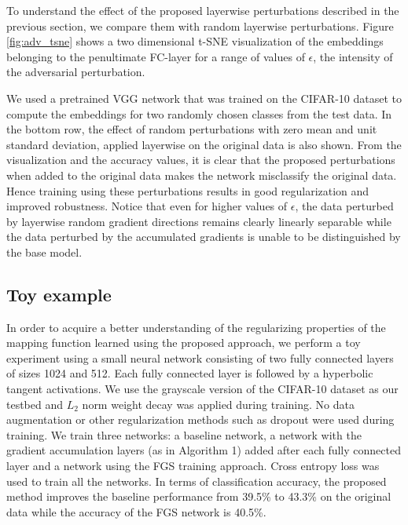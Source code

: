 \documentclass[letterpaper]{article} %
\begin{document}
  
To understand the effect of the proposed layerwise perturbations described in the previous section, we compare them with random layerwise perturbations. Figure \ref{fig:adv_tsne} shows a two dimensional t-SNE \cite{maaten2008visualizing} visualization of the embeddings belonging to the penultimate FC-layer for a range of values of $\epsilon$, the intensity of the adversarial perturbation. 

We used a pretrained VGG network that was trained on the CIFAR-10 dataset to compute the embeddings for two randomly chosen classes from the test data. In the bottom row, the effect of random perturbations with zero mean and unit standard deviation, applied layerwise on the original data is also shown. From the visualization and the accuracy values, it is clear that the proposed perturbations when added to the original data makes the network misclassify the original data. Hence training using these perturbations results in good regularization and improved robustness. Notice that even for higher values of $\epsilon$, the data perturbed by layerwise random gradient directions remains clearly linearly separable while the data perturbed by the accumulated gradients is unable to be distinguished by the base model. 

\subsection{Toy example}\label{subsec:toy-eg}
In order to acquire a better understanding of the regularizing properties of the mapping function learned using the proposed approach, we perform a toy experiment using a small neural network consisting of two fully connected layers of sizes 1024 and 512. Each fully connected layer is followed by a hyperbolic tangent activations. We use the grayscale version of the CIFAR-10 dataset as our testbed and $L_2$ norm weight decay was applied during training. No data augmentation or other regularization methods such as dropout were used during training. We train three networks: a baseline network, a network with the gradient accumulation layers (as in Algorithm 1) added after each fully connected layer and a network using the FGS training approach. Cross entropy loss was used to train all the networks. In terms of classification accuracy, the proposed method improves the baseline performance from 39.5\% to 43.3\% on the original data while the accuracy of the FGS network is 40.5\%. 
\end{document}
